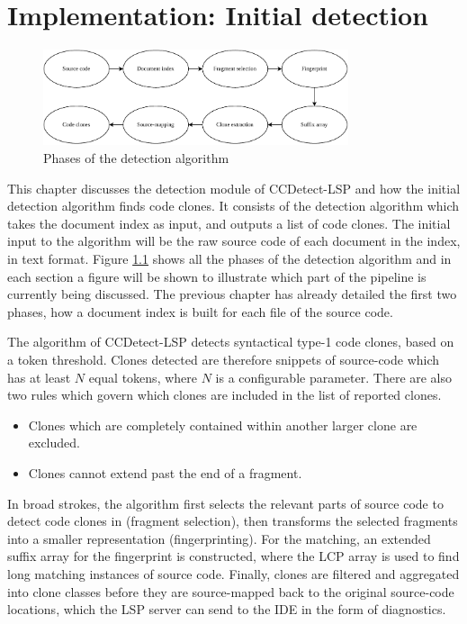 \chapter{Implementation: Initial detection}
\label{initialdetection}

\begin{figure}[H]
    \begin{center}
        \includegraphics[width=0.8\textwidth]{figures/phases/phases_all.drawio.pdf}
    \end{center}
    \caption{Phases of the detection algorithm}
    \label{fig:allphases}
\end{figure}

This chapter discusses the detection module of CCDetect-LSP and how the initial detection
algorithm finds code clones. It consists of the detection algorithm which takes the
document index as input, and outputs a list of code clones. The initial input to the
algorithm will be the raw source code of each document in the index, in text format.
Figure \ref{fig:allphases} shows all the phases of the detection algorithm and in each
section a figure will be shown to illustrate which part of the pipeline is currently being
discussed. The previous chapter has already detailed the first two phases, how a document
index is built for each file of the source code.

The algorithm of CCDetect-LSP detects syntactical type-1 code clones, based on a token
threshold. Clones detected are therefore snippets of source-code which has at least $N$
equal tokens, where $N$ is a configurable parameter. There are also two rules which govern
which clones are included in the list of reported clones.

\begin{itemize}
    \item Clones which are completely contained within another larger clone are excluded.
    \item Clones cannot extend past the end of a fragment.
\end{itemize}

In broad strokes, the algorithm first selects the relevant parts of source code to detect
code clones in (fragment selection), then transforms the selected fragments into a smaller
representation (fingerprinting). For the matching, an extended suffix array for the
fingerprint is constructed, where the LCP array is used to find long matching instances of
source code. Finally, clones are filtered and aggregated into clone classes before they
are source-mapped back to the original source-code locations, which the LSP server can
send to the IDE in the form of diagnostics.

